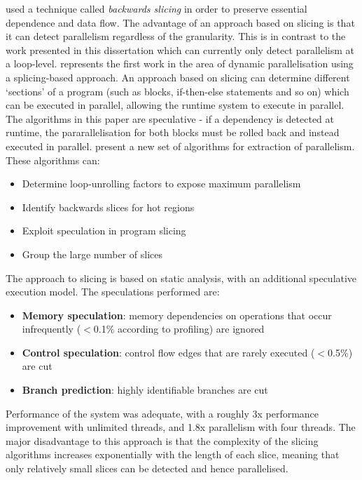 \citet{Wang2009} used a technique called \textit{backwards slicing} \citep{Weiser} in order to preserve essential dependence and data flow. The advantage of an approach based on slicing is that it can detect parallelism regardless of the granularity. This is in contrast to the work presented in this dissertation which can currently only detect parallelism at a loop-level. \citet{Wang2009} represents the first work in the area of dynamic parallelisation using a splicing-based approach. An approach based on slicing can determine different `sections' of a program (such as blocks, if-then-else statements and so on) which can be executed in parallel, allowing the runtime system to execute in parallel. The algorithms in this paper are speculative - if a dependency is detected at runtime, the pararallelisation for both blocks must be rolled back and instead executed in parallel. \citeauthor{Wang2009} present a new set of algorithms for extraction of parallelism. These algorithms can:

\begin{itemize}
	\item Determine loop-unrolling factors to expose maximum parallelism
	\item Identify backwards slices for hot regions
	\item Exploit speculation in program slicing
	\item Group the large number of slices 
\end{itemize}

The approach to slicing is based on static analysis, with an additional speculative execution model. The speculations performed are:

\begin{itemize}
	\item \textbf{Memory speculation}: memory dependencies on operations that occur infrequently ($<$0.1\% according to profiling) are ignored
	\item \textbf{Control speculation}: control flow edges that are rarely executed ($<$0.5\%) are cut
	\item \textbf{Branch prediction}: highly identifiable branches are cut
\end{itemize}

Performance of the system was adequate, with a roughly 3x performance improvement with unlimited threads, and 1.8x parallelism with four threads. The major disadvantage to this approach is that the complexity of the slicing algorithms increases exponentially with the length of each slice, meaning that only relatively small slices can be detected and hence parallelised. 

